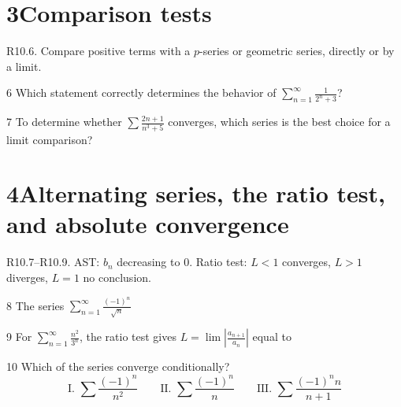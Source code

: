 \documentclass{apcalc}
\begin{document}
\section*{3\quad Comparison tests}
\begin{setrule}R10.6. Compare positive terms with a $p$-series or geometric series, directly or by a limit.\end{setrule}
\begin{q}{6}
Which statement correctly determines the behavior of $\displaystyle\sum_{n=1}^\infty\frac{1}{2^n+3}$?
\end{q}
\begin{q}{7}
To determine whether $\displaystyle\sum\frac{2n+1}{n^3+5}$ converges, which series is the best choice for a limit comparison?
\end{q}
\section*{4\quad Alternating series, the ratio test, and absolute convergence}
\begin{setrule}R10.7–R10.9. AST: $b_n$ decreasing to 0. Ratio test: $L<1$ converges, $L>1$ diverges, $L=1$ no conclusion.\end{setrule}
\begin{q}{8}
The series $\displaystyle\sum_{n=1}^\infty\frac{(-1)^n}{\sqrt n}$
\end{q}
\begin{q}{9}
For $\displaystyle\sum_{n=1}^\infty\frac{n^2}{3^n}$, the ratio test gives $L=\lim\left|\frac{a_{n+1}}{a_n}\right|$ equal to
\end{q}
\begin{q}{10}
Which of the series converge conditionally? $$\text{I. }\sum\frac{(-1)^n}{n^2}\qquad\text{II. }\sum\frac{(-1)^n}{n}\qquad\text{III. }\sum\frac{(-1)^nn}{n+1}$$
\end{q}
\end{document}
